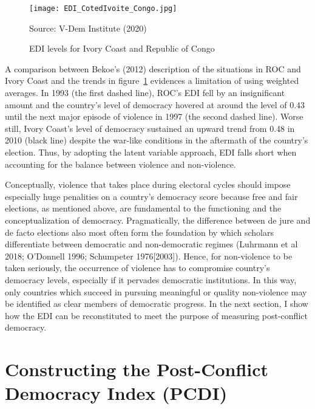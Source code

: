 \documentclass [11pt]{article}
\begin{document}
\begin{figure} [h!]

\caption{EDI levels for Ivory Coast and Republic of Congo}
\label{fig2}%
\begin{center} 
\small
 \texttt{[image: EDI\_CotedIvoite\_Congo.jpg]}
 
{\footnotesize Source: V-Dem Institute (2020)}

\end{center} 
\end{figure}

A comparison between Bekoe's (2012) description of the situations in ROC and Ivory Coast and the trends in figure~\ref{fig2} evidences a limitation of using weighted averages. In 1993 (the first dashed line), ROC's EDI fell by an insignificant amount and the country's level of democracy hovered at around the level of 0.43 until the next major episode of violence in 1997 (the second dashed line). Worse still, Ivory Coast's level of democracy sustained an upward trend from 0.48 in 2010 (black line) despite the war-like conditions in the aftermath of the country's election. Thus, by adopting the latent variable approach, EDI falls short when accounting for the balance between violence and non-violence.

Conceptually, violence that takes place during electoral cycles should impose especially huge penalities on a country's democracy score because free and fair elections, as mentioned above, are fundamental to the functioning and the conceptualization of democracy. Pragmatically, the difference between de jure and de facto elections also most often form the foundation by which scholars differentiate between democratic and non-democratic regimes (Luhrmann et al 2018; O'Donnell 1996; Schumpeter 1976[2003]). Hence, for non-violence to be taken seriously, the occurrence of violence has to compromise country's democracy levels, especially if it pervades democratic institutions. In this way, only countries which succeed in pursuing meaningful or quality non-violence may be identified as clear members of democratic progress. In the next section, I show how the EDI can be reconstituted to meet the purpose of measuring post-conflict democracy.

\section*{Constructing the Post-Conflict Democracy Index (PCDI)}
\end{document}
